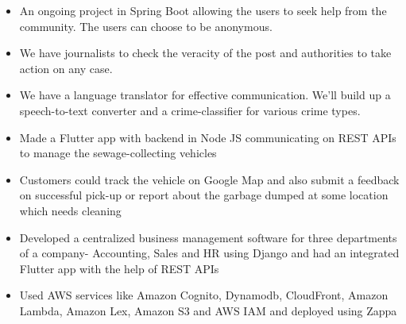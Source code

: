 \documentclass[10pt,a4paper]{altacv}
\begin{document}

\begin{itemize}
  \item An ongoing project in Spring Boot allowing the users to seek help from the community. The users can choose to be anonymous.
  \item We have journalists to check the veracity of the post and authorities to take action on any case.
  \item We have a language translator for effective communication. We'll build up a speech-to-text converter and a crime-classifier for various crime types. 
\end{itemize}
\medskip






\begin{itemize}
  \item Made a Flutter app with backend in Node JS communicating on REST APIs to manage the sewage-collecting vehicles
  \item Customers could track the vehicle on Google Map and also submit a feedback on successful pick-up or report about the garbage dumped at some location which needs cleaning
\end{itemize}
\medskip



\begin{itemize}
  \item Developed a centralized business management software for three departments of a company- Accounting, Sales and HR using Django and had an integrated Flutter app with the help of REST APIs
\end{itemize}
\medskip




\begin{itemize}
  \item Used AWS services like Amazon Cognito, Dynamodb, CloudFront, Amazon Lambda, Amazon Lex, Amazon S3 and AWS IAM and deployed using Zappa    
\end{itemize}
\medskip
\end{document}
